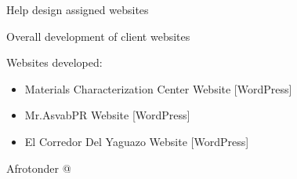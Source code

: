 \documentclass[]{deedy-resume-openfont}
\begin{document}
\break
{}
\begin{tightemize}
\item Help design assigned websites
\item Overall development of client websites 
\item Websites developed: \\ 
\begin{itemize}
    \item Materials Characterization Center Website [WordPress]
    \item Mr.AsvabPR Website [WordPress]
    \item El Corredor Del Yaguazo Website [WordPress]
\end{itemize}
\end{tightemize}
\sectionsep





\begin{center}
Afrotonder @ {\the\year{}}
\end{center}
\end{document}
